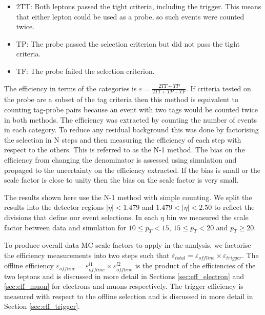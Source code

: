 \begin{itemize}
    \item 2TT: Both leptons passed the tight criteria, including the trigger. This means that either lepton could be used as a probe, 
    so such events were counted twice.
    \item TP: The probe passed the selection criterion but did not pass the tight criteria.
    \item TF: The probe failed the selection criterion.
\end{itemize}

The efficiency in terms of the categories is $\varepsilon = \frac{2TT + TP}{2TT + TP + TF}$.
If criteria tested on the probe are a subset of the tag criteria then
this method is equivalent to counting tag-probe pairs because an event with two tags
would be counted twice in both methods.
The efficiency was extracted by counting the number of events in each category.
To reduce any residual background this was done by factorising the selection in
N steps and then measuring the efficiency of each step with respect to 
the others.  This is referred to as the N-1 method.
The bias on the efficiency from changing the denominator is assessed using
simulation and propaged to the uncertainty on the efficiency extracted.
If the bias is small or the scale factor is close to unity then the bias on
the scale factor is very small.

The results shown here use the N-1 method with simple counting.
We split the results into the detector regions $|\eta|<1.479$ and $1.479<|\eta|<2.50$
to reflect the divisions that define our event selections.
In each $\eta$ bin we measured the scale factor between data and simulation
for $10\leq p_T<15$, $15\leq p_T<20$ and $p_T\geq 20$.

To produce overall data-MC scale factors to apply in the analysis, we factorise the efficiency measurements
into two steps such that $\varepsilon_{total} = \varepsilon_{offline} \times \varepsilon_{trigger}$.
The offline efficiency $\varepsilon_{offline} = \varepsilon_{offline}^{l1} \times \varepsilon_{offline}^{l2}$
is the product of the efficiencies of the two leptons and is discussed in more detail in Sections \ref{sec:eff_electron}
and \ref{sec:eff_muon} for electrons and muons respectively.
The trigger efficiency is measured with respect to the offline selection and
is discussed in more detail in Section \ref{sec:eff_trigger}.

